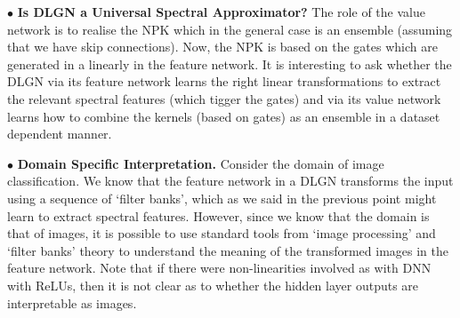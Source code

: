$\bullet$ \textbf{Is DLGN a Universal Spectral Approximator?} The role of the value network is to realise the NPK which in the general case is an ensemble (assuming that we have skip connections). Now, the NPK is based on the gates which are generated in a linearly in the feature network. It is interesting to ask whether the DLGN via its feature network learns the right linear transformations to extract the relevant spectral features (which tigger the gates) and  via its value network learns how to combine the kernels (based on gates) as an ensemble in a dataset dependent manner.

$\bullet$ \textbf{Domain Specific Interpretation.} Consider the domain of image classification. We know that the feature network in a DLGN transforms the input using a sequence of `filter banks', which as we said in the previous point might learn to extract spectral features. However, since we know that the domain is that of images, it is possible to use standard tools from `image processing' and `filter banks' theory to understand the meaning of the transformed images in the feature network. Note that if there were non-linearities involved as with DNN with ReLUs, then it is not clear as to whether the hidden layer outputs are interpretable as images. 









 

